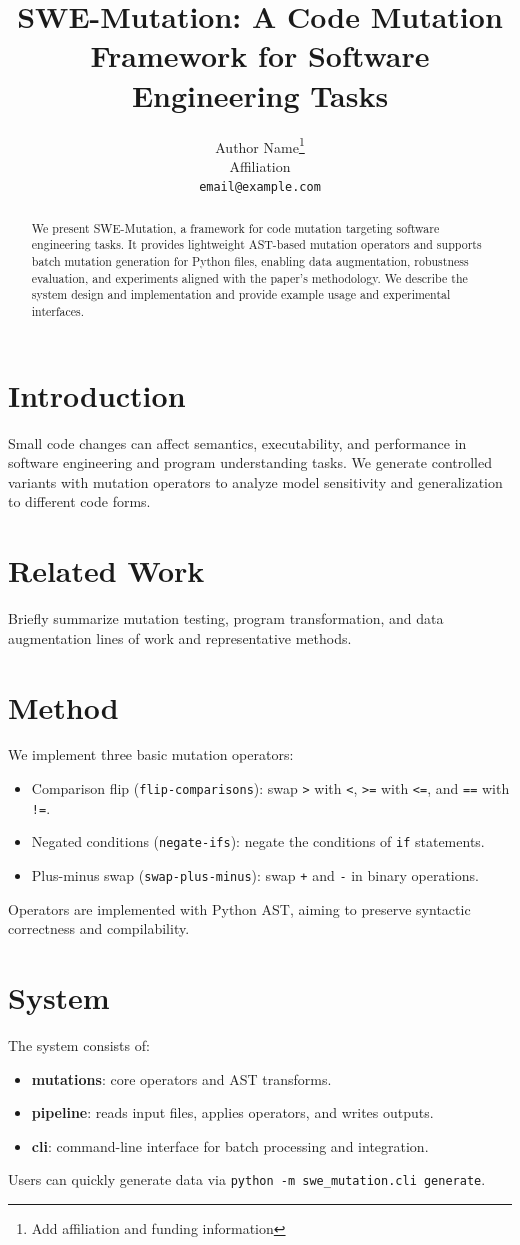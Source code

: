 \documentclass[11pt]{article}
\title{SWE-Mutation: A Code Mutation Framework for Software Engineering Tasks}
\author{
  Author Name\thanks{Add affiliation and funding information} \\
  Affiliation \\
  \texttt{email@example.com}
}
\date{}
\begin{document}
\maketitle

\begin{abstract}
We present SWE-Mutation, a framework for code mutation targeting software engineering tasks.
It provides lightweight AST-based mutation operators and supports batch mutation generation for Python files,
enabling data augmentation, robustness evaluation, and experiments aligned with the paper's methodology. We describe
the system design and implementation and provide example usage and experimental interfaces.
\end{abstract}

\section{Introduction}
Small code changes can affect semantics, executability, and performance in software engineering and program understanding tasks.
We generate controlled variants with mutation operators to analyze model sensitivity and generalization to different code forms.

\section{Related Work}
Briefly summarize mutation testing, program transformation, and data augmentation lines of work and representative methods.

\section{Method}
We implement three basic mutation operators:
\begin{itemize}
  \item Comparison flip (\texttt{flip-comparisons}): swap \texttt{>} with \texttt{<}, \texttt{>=} with \texttt{<=}, and \texttt{==} with \texttt{!=}.
  \item Negated conditions (\texttt{negate-ifs}): negate the conditions of \texttt{if} statements.
  \item Plus-minus swap (\texttt{swap-plus-minus}): swap \texttt{+} and \texttt{-} in binary operations.
\end{itemize}
Operators are implemented with Python AST, aiming to preserve syntactic correctness and compilability.

\section{System}
The system consists of:
\begin{itemize}
  \item \textbf{mutations}: core operators and AST transforms.
  \item \textbf{pipeline}: reads input files, applies operators, and writes outputs.
  \item \textbf{cli}: command-line interface for batch processing and integration.
\end{itemize}
Users can quickly generate data via \texttt{python -m swe\_mutation.cli generate}.
\end{document}
